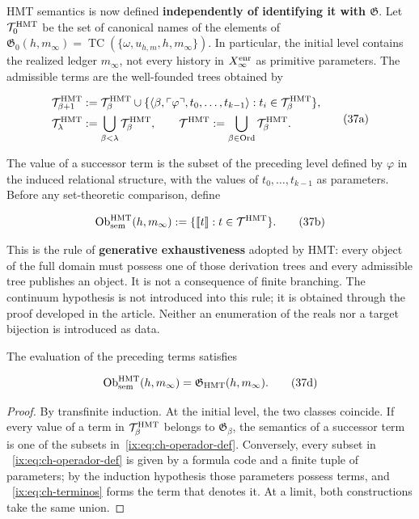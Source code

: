 HMT semantics is now defined \textbf{independently of identifying it with
\(\mathfrak G\)}. Let \(\mathcal T_0^{\rm HMT}\) be the set of canonical names
of the elements of
\(\mathfrak G_0(h,m_\infty)=
\operatorname{TC}(\{\omega,u_{h,m},h,m_\infty\})\). In particular, the
initial level contains the realized ledger \(m_\infty\), not every history
in \(X_\infty^{\rm enr}\) as primitive parameters. The admissible terms are
the well-founded trees obtained by

\[
 \begin{aligned}
 \mathcal T^{\rm HMT}_{\beta+1}
 &:={\mathcal T}^{\rm HMT}_\beta\cup
 \{\langle\beta,\ulcorner\varphi\urcorner,
       t_0,\ldots,t_{k-1}\rangle:
       t_i\in\mathcal T^{\rm HMT}_\beta\},\\
 \mathcal T^{\rm HMT}_\lambda&:=
       \bigcup_{\beta<\lambda}\mathcal T^{\rm HMT}_\beta,
 \qquad
 \mathcal T^{\rm HMT}:=
       \bigcup_{\beta\in\operatorname{Ord}}\mathcal T^{\rm HMT}_\beta.
 \end{aligned}
\tag{37a}\label{ix:eq:ch-terminos}
\]

The value of a successor term is the subset of the preceding level defined by
\(\varphi\) in the induced relational structure, with the values of
\(t_0,\ldots,t_{k-1}\) as parameters. Before any set-theoretic comparison,
define

\[
 \operatorname{Ob}_{\rm sem}^{\rm HMT}(h,m_\infty)
 :=\{\llbracket t\rrbracket:t\in\mathcal T^{\rm HMT}\}.
\tag{37b}\label{ix:eq:ch-objetos-semanticos}
\]

This is the rule of \textbf{generative exhaustiveness} adopted by HMT: every
object of the full domain must possess one of those derivation trees and every
admissible tree publishes an object. It is not a consequence of finite
branching. The continuum hypothesis is not introduced into this rule; it is obtained
through the proof developed in the article. Neither an enumeration of the reals
nor a target bijection is introduced as data.

\begin{theorem}
\label{ix:thm:ch-6a}
The evaluation of the preceding terms satisfies

\[
 \operatorname{Ob}_{\rm sem}^{\rm HMT}(h,m_\infty)
 =\mathfrak G_{\rm HMT}(h,m_\infty).
\tag{37d}\label{ix:eq:ch-equivalencia-semantica}
\]

\end{theorem}
\begin{proof}
By transfinite induction. At the initial level, the two classes coincide. If
every value of a term in \(\mathcal T^{\rm HMT}_\beta\) belongs to
\(\mathfrak G_\beta\), the semantics of a successor term is one of the subsets
in~\eqref{ix:eq:ch-operador-def}. Conversely, every subset in
~\eqref{ix:eq:ch-operador-def} is given by a formula code and a finite tuple of
parameters; by the induction hypothesis those parameters possess terms, and
~\eqref{ix:eq:ch-terminos} forms the term that denotes it. At a limit, both
constructions take the same union.
\end{proof}


